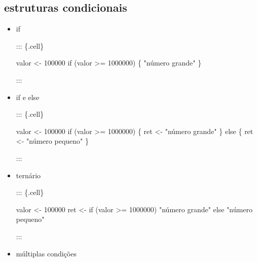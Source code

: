 \documentclass[
  letterpaper,
  DIV=11,
  numbers=noendperiod]{scrreprt}
\newenvironment{Shaded}{\begin{snugshade}}{\end{snugshade}}
\newcommand{\ControlFlowTok}[1]{\textcolor[rgb]{0.00,0.23,0.31}{#1}}
\newcommand{\DecValTok}[1]{\textcolor[rgb]{0.68,0.00,0.00}{#1}}
\newcommand{\NormalTok}[1]{\textcolor[rgb]{0.00,0.23,0.31}{#1}}
\newcommand{\OtherTok}[1]{\textcolor[rgb]{0.00,0.23,0.31}{#1}}
\newcommand{\SpecialCharTok}[1]{\textcolor[rgb]{0.37,0.37,0.37}{#1}}
\newcommand{\StringTok}[1]{\textcolor[rgb]{0.13,0.47,0.30}{#1}}
\begin{document}
\hypertarget{estruturas-condicionais}{%
\subsection{estruturas condicionais}\label{estruturas-condicionais}}

\begin{itemize}
\item
  if

  ::: \{.cell\}

\begin{Shaded}
\begin{Highlighting}[]
\NormalTok{valor }\OtherTok{\textless{}{-}} \DecValTok{100000}
\ControlFlowTok{if}\NormalTok{ (valor }\SpecialCharTok{\textgreater{}=} \DecValTok{1000000}\NormalTok{) \{}
    \StringTok{"número grande"}
\NormalTok{\}}
\end{Highlighting}
\end{Shaded}

  :::
\item
  if e else

  ::: \{.cell\}

\begin{Shaded}
\begin{Highlighting}[]
\NormalTok{valor }\OtherTok{\textless{}{-}} \DecValTok{100000}
\ControlFlowTok{if}\NormalTok{ (valor }\SpecialCharTok{\textgreater{}=} \DecValTok{1000000}\NormalTok{) \{}
\NormalTok{    ret }\OtherTok{\textless{}{-}} \StringTok{"número grande"}
\NormalTok{\} }\ControlFlowTok{else}\NormalTok{ \{}
\NormalTok{    ret }\OtherTok{\textless{}{-}} \StringTok{"número pequeno"}
\NormalTok{\}}
\end{Highlighting}
\end{Shaded}

  :::
\item
  ternário

  ::: \{.cell\}

\begin{Shaded}
\begin{Highlighting}[]
\NormalTok{valor }\OtherTok{\textless{}{-}} \DecValTok{100000}
\NormalTok{ret }\OtherTok{\textless{}{-}} \ControlFlowTok{if}\NormalTok{ (valor }\SpecialCharTok{\textgreater{}=} \DecValTok{1000000}\NormalTok{) }\StringTok{"número grande"} \ControlFlowTok{else} \StringTok{"número pequeno"}        
\end{Highlighting}
\end{Shaded}

  :::
\item
  múltiplas condições


\end{itemize}
\end{document}
